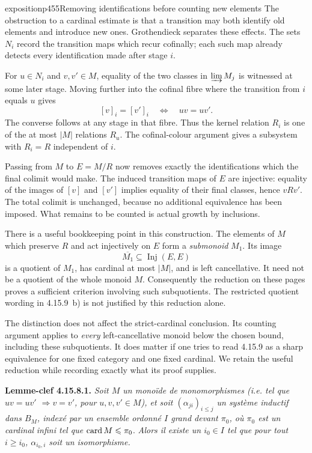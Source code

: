 \begin{dcomment}{exposition}{p455}{Removing identifications before counting new elements}
The obstruction to a cardinal estimate is that a transition may both identify old elements and introduce new ones. Grothendieck separates these effects. The sets $N_i$ record the transition maps which recur cofinally; each such map already detects every identification made after stage $i$.

For $u\in N_i$ and $v,v'\in M$, equality of the two classes in $\varinjlim M_j$ is witnessed at some later stage. Moving further into the cofinal fibre where the transition from $i$ equals $u$ gives
\[
[v]_i=[v']_i\quad\Longleftrightarrow\quad uv=uv'.
\]
The converse follows at any stage in that fibre. Thus the kernel relation $R_i$ is one of the at most $|M|$ relations $R_u$. The cofinal-colour argument gives a subsystem with $R_i=R$ independent of $i$.

Passing from $M$ to $E=M/R$ now removes exactly the identifications which the final colimit would make. The induced transition maps of $E$ are injective: equality of the images of $[v]$ and $[v']$ implies equality of their final classes, hence $vRv'$. The total colimit is unchanged, because no additional equivalence has been imposed. What remains to be counted is actual growth by inclusions.

There is a useful bookkeeping point in this construction. The elements of $M$ which preserve $R$ and act injectively on $E$ form a \emph{submonoid} $M_1$. Its image
\[
\overline{M_1}\subseteq\operatorname{Inj}(E,E)
\]
is a quotient of $M_1$, has cardinal at most $|M|$, and is left cancellative. It need not be a quotient of the whole monoid $M$. Consequently the reduction on these pages proves a sufficient criterion involving such subquotients. The restricted quotient wording in 4.15.9~b) is not justified by this reduction alone.

The distinction does not affect the strict-cardinal conclusion. Its counting argument applies to \emph{every} left-cancellative monoid below the chosen bound, including these subquotients. It does matter if one tries to read 4.15.9 as a sharp equivalence for one fixed category and one fixed cardinal. We retain the useful reduction while recording exactly what its proof supplies.
\end{dcomment}


\textbf{Lemme-clef 4.15.8.1.} \textit{Soit $M$ un monoïde de monomorphismes (i.e. tel que $uv = uv'$ $\Longrightarrow v = v'$, pour $u,v,v' \in M$), et soit $(\alpha_{ji})_{i\leqslant j}$ un système inductif dans $B_M$, indexé par un ensemble ordonné $I$ grand devant $\pi_0$, où $\pi_0$ est un cardinal}
\textit{infini tel que} $\operatorname{card} M \leqslant \pi_0$. \textit{Alors il existe un $i_0 \in I$ tel que pour tout $i \geqslant i_0$, $\alpha_{i_0,i}$ soit un isomorphisme.}

